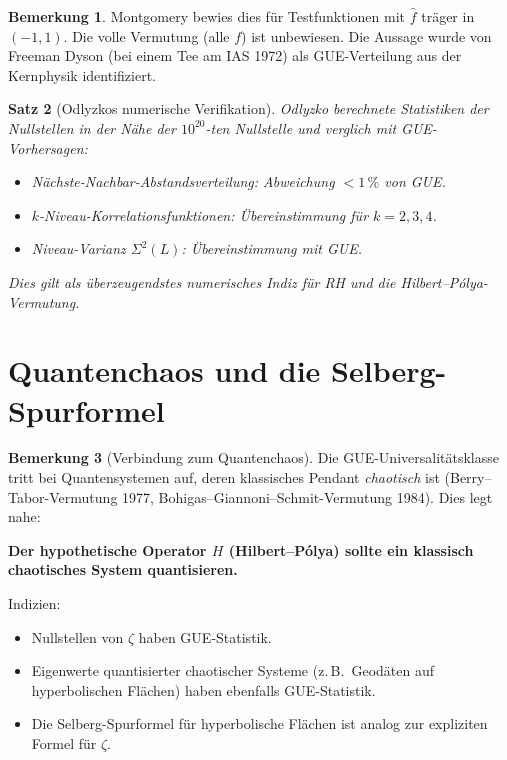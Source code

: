 \documentclass[12pt,a4paper]{amsart}
\newtheorem{theorem}{Satz}[section]
\theoremstyle{definition}
\newtheorem{remark}[theorem]{Bemerkung}
\begin{document}
\begin{remark}
Montgomery bewies dies f\"ur Testfunktionen mit $\hat f$ tr\"ager in $(-1,1)$.
Die volle Vermutung (alle $f$) ist unbewiesen.
Die Aussage wurde von Freeman Dyson (bei einem Tee am IAS 1972) als
GUE-Verteilung aus der Kernphysik identifiziert.
\end{remark}

\begin{theorem}[Odlyzkos numerische Verifikation]
\label{thm:odlyzko_gue}
Odlyzko \cite{Odlyzko1987} berechnete Statistiken der Nullstellen in der
N\"ahe der $10^{20}$-ten Nullstelle und verglich mit GUE-Vorhersagen:
\begin{itemize}
  \item N\"achste-Nachbar-Abstandsverteilung: Abweichung $< 1\,\%$ von GUE.
  \item $k$-Niveau-Korrelationsfunktionen: \"Ubereinstimmung f\"ur $k=2,3,4$.
  \item Niveau-Varianz $\Sigma^2(L)$: \"Ubereinstimmung mit GUE.
\end{itemize}
Dies gilt als \"uberzeugendstes numerisches Indiz f\"ur RH und
die Hilbert--P\'olya-Vermutung.
\end{theorem}

\section{Quantenchaos und die Selberg-Spurformel}

\begin{remark}[Verbindung zum Quantenchaos]
Die GUE-Universalit\"atsklasse tritt bei Quantensystemen auf, deren
klassisches Pendant \emph{chaotisch} ist (Berry--Tabor-Vermutung 1977,
Bohigas--Giannoni--Schmit-Vermutung 1984). Dies legt nahe:

\textbf{Der hypothetische Operator $H$ (Hilbert--P\'olya) sollte ein
klassisch chaotisches System quantisieren.}

Indizien:
\begin{itemize}
  \item Nullstellen von $\zeta$ haben GUE-Statistik.
  \item Eigenwerte quantisierter chaotischer Systeme (z.\,B.\ Geod\"aten auf
    hyperbolischen Fl\"achen) haben ebenfalls GUE-Statistik.
  \item Die Selberg-Spurformel f\"ur hyperbolische Fl\"achen ist analog
    zur expliziten Formel f\"ur $\zeta$.
\end{itemize}
\end{remark}
\end{document}
